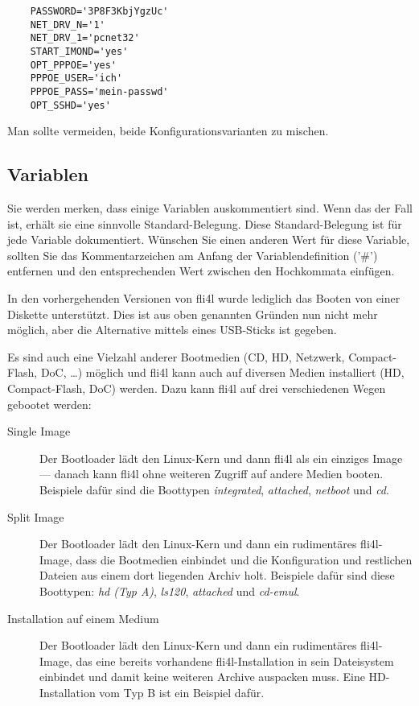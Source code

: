 \begin{example}
\begin{verbatim}
    PASSWORD='3P8F3KbjYgzUc'
    NET_DRV_N='1'
    NET_DRV_1='pcnet32'
    START_IMOND='yes'
    OPT_PPPOE='yes'
    PPPOE_USER='ich'
    PPPOE_PASS='mein-passwd'
    OPT_SSHD='yes'
\end{verbatim}
\end{example}

Man sollte vermeiden, beide Konfigurationsvarianten zu mischen.

\subsection{Variablen}

  Sie werden merken, dass einige Variablen auskommentiert sind. Wenn das der 
  Fall ist, erhält sie eine sinnvolle Standard-Belegung. Diese Standard-Belegung 
  ist für jede Variable dokumentiert. Wünschen Sie einen anderen Wert für diese 
  Variable, sollten Sie das Kommentarzeichen am Anfang der Variablendefinition ('\#') 
  entfernen und den entsprechenden Wert zwischen den Hochkommata einfügen.


In den vorhergehenden Versionen von fli4l wurde lediglich das Booten
von einer Diskette unterstützt. Dies ist aus oben genannten Gründen nun
nicht mehr möglich, aber die Alternative mittels eines USB-Sticks ist 
gegeben.

Es sind auch eine Vielzahl anderer Bootmedien (CD, HD, Netzwerk,
Compact-Flash, DoC, \ldots) möglich und fli4l kann auch auf diversen
Medien installiert (HD, Compact-Flash, DoC) werden. Dazu kann fli4l auf
drei verschiedenen Wegen gebootet werden:

\begin{description}
\item [Single Image] Der Bootloader lädt den Linux-Kern und dann fli4l
als ein einziges Image --- danach kann fli4l ohne weiteren Zugriff auf
andere Medien booten. Beispiele dafür sind die Boottypen \emph{integrated}, 
\emph{attached}, \emph{netboot} und \emph{cd}.
\item [Split Image] Der Bootloader lädt den Linux-Kern und dann ein
rudimentäres fli4l-Image, dass die Bootmedien einbindet und die
Konfiguration und restlichen Dateien aus einem dort liegenden Archiv
holt. Beispiele dafür sind diese Boottypen: \emph{hd (Typ A)}, \emph{ls120},
\emph{attached} und \emph{cd-emul}.
\item [Installation auf einem Medium] Der Bootloader lädt den
Linux-Kern und dann ein rudimentäres fli4l-Image, das eine bereits
vorhandene fli4l-Installation in sein Dateisystem einbindet und damit
keine weiteren Archive auspacken muss. Eine HD-Installation vom Typ B
ist ein Beispiel dafür.
\end{description}

